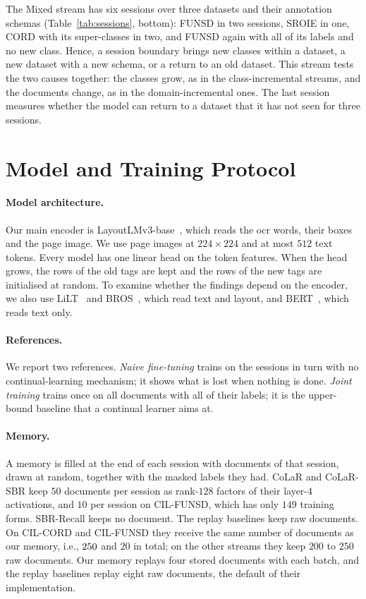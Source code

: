 The Mixed stream has six sessions over three datasets and their annotation schemas
(Table~\ref{tab:sessions}, bottom): FUNSD in two sessions, SROIE in one, CORD with its
super-classes in two, and FUNSD again with all of its labels and no new class. Hence, a
session boundary brings new classes within a dataset, a new dataset with a new schema, or a
return to an old dataset. This stream tests the two causes together: the classes grow, as
in the class-incremental streams, and the documents change, as in the domain-incremental
ones. The last session measures whether the model can return to a dataset that it has not
seen for three sessions.

\section{Model and Training Protocol}
\label{sec:e-protocol}

\paragraph{Model architecture.} Our main encoder is
LayoutLMv3-base~\citep{huang2022layoutlmv3}, which reads the \gls{ocr} words, their boxes
and the page image. We use page images at $224\times224$ and at most $512$ text tokens.
Every model has one linear head on the token features. When the head grows, the rows of the
old tags are kept and the rows of the new tags are initialised at random. To examine
whether the findings depend on the encoder, we also use LiLT~\citep{wang2022lilt} and
BROS~\citep{hong2022bros}, which read text and layout, and BERT~\citep{devlin2019bert},
which reads text only.

\paragraph{References.} We report two references. \emph{Naive fine-tuning} trains on the
sessions in turn with no continual-learning mechanism; it shows what is lost when nothing
is done. \emph{Joint training} trains once on all documents with all of their labels; it is
the upper-bound baseline that a continual learner aims at.

\paragraph{Memory.} A memory is filled at the end of each session with documents of that
session, drawn at random, together with the masked labels they had. CoLaR and CoLaR-SBR
keep $50$ documents per session as rank-$128$ factors of their layer-$4$ activations, and
$10$ per session on CIL-FUNSD, which has only $149$ training forms. SBR-Recall keeps no
document. The replay baselines keep raw documents. On CIL-CORD and CIL-FUNSD they receive
the same number of documents as our memory, i.e., $250$ and $20$ in total; on the
other streams they keep $200$ to $250$ raw documents. Our memory replays four stored documents with each batch, and the replay baselines
replay eight raw documents, the default of their implementation.

